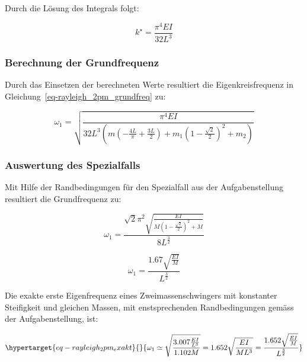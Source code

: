 \documentclass[
  letterpaper,
  DIV=11]{scrreprt}
\begin{document}
Durch die Lösung des Integrals folgt:

\begin{equation}k^{\star} = \frac{\pi^{4} E I}{32 L^{3}}\end{equation}

\hypertarget{berechnung-der-grundfrequenz}{%
\subsubsection{Berechnung der
Grundfrequenz}\label{berechnung-der-grundfrequenz}}

Durch das Einsetzen der berechneten Werte resultiert die
Eigenkreisfrequenz in Gleichung~\ref{eq-rayleigh_2pm_grundfreq} zu:

\begin{equation}\omega_{1} = \sqrt{\frac{\pi^{4} E I}{32 L^{3} \left(m \left(- \frac{4 L}{\pi} + \frac{3 L}{2}\right) + m_{1} \left(1 - \frac{\sqrt{2}}{2}\right)^{2} + m_{2}\right)}}\end{equation}

\hypertarget{auswertung-des-spezialfalls}{%
\subsubsection{Auswertung des
Spezialfalls}\label{auswertung-des-spezialfalls}}

Mit Hilfe der Randbedingungen für den Spezialfall aus der
Aufgabenstellung resultiert die Grundfrequenz zu:

\begin{equation}\omega_{1} = \frac{\sqrt{2} \pi^{2} \sqrt{\frac{E I}{M \left(1 - \frac{\sqrt{2}}{2}\right)^{2} + M}}}{8 L^{\frac{3}{2}}}\end{equation}

\begin{equation}\omega_{1} = \frac{1.67 \sqrt{\frac{E I}{M}}}{L^{\frac{3}{2}}}\end{equation}

Die exakte erste Eigenfrequenz eines Zweimassenschwingers mit konstanter
Steifigkeit und gleichen Massen, mit enstsprechenden Randbedingungen
gemäss der Aufgabenstellung, ist:

\begin{equation}\protect\hypertarget{eq-rayleigh_2pm_exakt}{}{
\omega_1 \simeq \sqrt{\frac{3.007\frac{EI}{L^3}}{1.102 M}} = 1.652 \sqrt{\frac{EI}{ML^3}} = \frac{1.652 \sqrt{\frac{E I}{M}}}{L^{\frac{3}{2}}}
}\label{eq-rayleigh_2pm_exakt}\end{equation}
\end{document}
